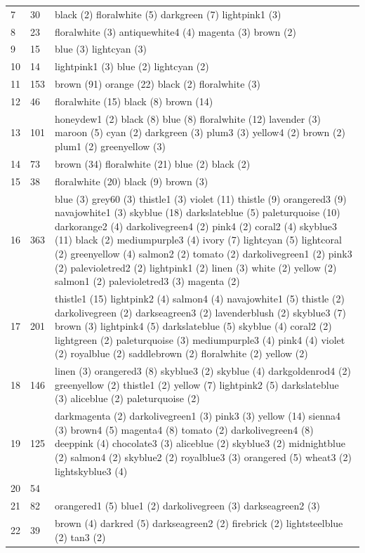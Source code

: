 \begin{landscape}
\begin{longtable}{|p{1.5cm}|p{1.25cm}|p{21cm}|}
7 & 30 & black (2) floralwhite (5) darkgreen (7) lightpink1 (3) \\
8 & 23 & floralwhite (3) antiquewhite4 (4) magenta (3) brown (2) \\
9 & 15 & blue (3) lightcyan (3) \\
10 & 14 & lightpink1 (3) blue (2) lightcyan (2) \\
11 & 153 & brown (91) orange (22) black (2) floralwhite (3) \\
12 & 46 & floralwhite (15) black (8) brown (14) \\
13 & 101 & honeydew1 (2) black (8) blue (8) floralwhite (12) lavender (3) maroon (5) cyan (2) darkgreen (3) plum3 (3) yellow4 (2) brown (2) plum1 (2) greenyellow (3) \\
14 & 73 & brown (34) floralwhite (21) blue (2) black (2) \\
15 & 38 & floralwhite (20) black (9) brown (3) \\
16 & 363 & blue (3) grey60 (3) thistle1 (3) violet (11) thistle (9) orangered3 (9) navajowhite1 (3) skyblue (18) darkslateblue (5) paleturquoise (10) darkorange2 (4) darkolivegreen4 (2) pink4 (2) coral2 (4) skyblue3 (11) black (2) mediumpurple3 (4) ivory (7) lightcyan (5) lightcoral (2) greenyellow (4) salmon2 (2) tomato (2) darkolivegreen1 (2) pink3 (2) palevioletred2 (2) lightpink1 (2) linen (3) white (2) yellow (2) salmon1 (2) palevioletred3 (3) magenta (2) \\
17 & 201 & thistle1 (15) lightpink2 (4) salmon4 (4) navajowhite1 (5) thistle (2) darkolivegreen (2) darkseagreen3 (2) lavenderblush (2) skyblue3 (7) brown (3) lightpink4 (5) darkslateblue (5) skyblue (4) coral2 (2) lightgreen (2) paleturquoise (3) mediumpurple3 (4) pink4 (4) violet (2) royalblue (2) saddlebrown (2) floralwhite (2) yellow (2) \\
18 & 146 & linen (3) orangered3 (8) skyblue3 (2) skyblue (4) darkgoldenrod4 (2) greenyellow (2) thistle1 (2) yellow (7) lightpink2 (5) darkslateblue (3) aliceblue (2) paleturquoise (2) \\
19 & 125 & darkmagenta (2) darkolivegreen1 (3) pink3 (3) yellow (14) sienna4 (3) brown4 (5) magenta4 (8) tomato (2) darkolivegreen4 (8) deeppink (4) chocolate3 (3) aliceblue (2) skyblue3 (2) midnightblue (2) salmon4 (2) skyblue2 (2) royalblue3 (3) orangered (5) wheat3 (2) lightskyblue3 (4) \\
20 & 54 & \\
21 & 82 & orangered1 (5) blue1 (2) darkolivegreen (3) darkseagreen2 (3) \\
22 & 39 & brown (4) darkred (5) darkseagreen2 (2) firebrick (2) lightsteelblue (2) tan3 (2) \\

\end{longtable}
\end{landscape}
